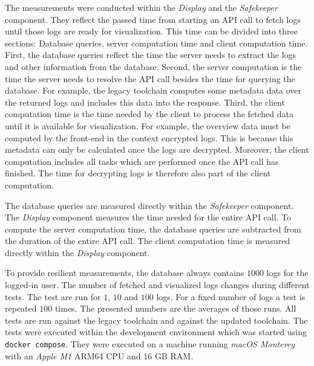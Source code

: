 \documentclass[../main.tex]{subfiles}
\begin{document}
The measurements were conducted within the \emph{Display} and the \emph{Safekeeper} component.
They reflect the passed time from starting an API call to fetch logs until those logs are ready for visualization.
This time can be divided into three sections: Database queries, server computation time and client computation time.
First, the database queries reflect the time the server needs to extract the logs and other information from the database.
Second, the server computation is the time the server needs to resolve the API call besides the time for querying the database.
For example, the legacy toolchain computes some metadata data over the returned logs and includes this data into the response.
Third, the client computation time is the time needed by the client to process the fetched data until it is available for visualization.
For example, the overview data must be computed by the front-end in the context encrypted logs.
This is because this metadata can only be calculated once the logs are decrypted.
Moreover, the client computation includes all tasks which are performed once the API call has finished.
The time for decrypting logs is therefore also part of the client computation.

The database queries are measured directly within the \emph{Safekeeper} component.
The \emph{Display} component measures the time needed for the entire API call.
To compute the server computation time, the database queries are subtracted from the duration of the entire API call.
The client computation time is measured directly within the \emph{Display} component.

To provide resilient measurements, the database always contains $1000$ logs for the logged-in user.
The number of fetched and visualized logs changes during different tests.
The test are run for $1$, $10$ and $100$ logs.
For a fixed number of logs a test is repeated $100$ times.
The presented numbers are the averages of those runs.
All tests are run against the legacy toolchain and against the updated toolchain.
The tests were executed within the development environment which was started using \verb|docker compose|.
They were executed on a machine running \emph{macOS Monterey} with an \emph{Apple M1} ARM64 CPU and 16 GB RAM.
\end{document}

